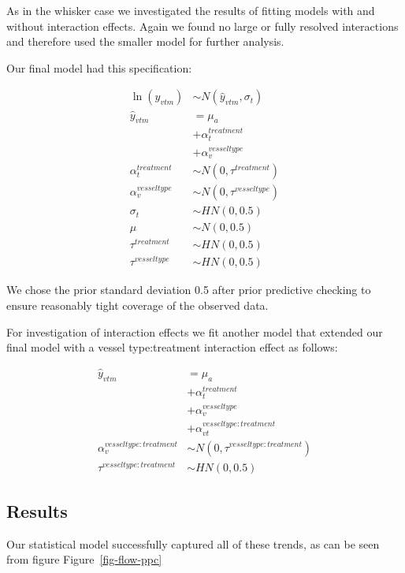\documentclass[
  letterpaper,
  DIV=11,
  numbers=noendperiod,
  oneside]{scrartcl}
\theoremstyle{plain}
\theoremstyle{remark}
\begin{document}
As in the whisker case we investigated the results of fitting models
with and without interaction effects. Again we found no large or fully
resolved interactions and therefore used the smaller model for further
analysis.

Our final model had this specification:

\begin{align}
\ln(y_{vtm}) &\sim N(\hat{y}_{vtm}, \sigma_t) \label{eq-flow-model} \\
\hat{y}_{vtm} &= \mu_a \nonumber \\
  &+ \alpha^{treatment}_{t} \nonumber \\
  &+ \alpha^{vesseltype}_{v} \nonumber \\
\alpha^{treatment}_t &\sim N(0, \tau^{treatment}) \nonumber \\
\alpha^{vesseltype}_v &\sim N(0, \tau^{vesseltype}) \nonumber \\
\sigma_t &\sim HN(0, 0.5) \nonumber \\
\mu &\sim N(0, 0.5) \nonumber \\
\tau^{treatment} &\sim HN(0, 0.5) \nonumber \\
\tau^{vesseltype} &\sim HN(0, 0.5) \nonumber
\end{align}

We chose the prior standard deviation 0.5 after prior predictive
checking to ensure reasonably tight coverage of the observed data.

For investigation of interaction effects we fit another model that
extended our final model with a vessel type:treatment interaction effect
as follows:

\begin{align}
\hat{y}_{vtm} &= \mu_a \nonumber \\
  &+ \alpha^{treatment}_{t} \nonumber \\
  &+ \alpha^{vesseltype}_{v} \nonumber \\
  &+ \alpha^{vesseltype:treatment}_{vt} \nonumber \\
\alpha^{vesseltype:treatment}_v &\sim N(0, \tau^{vesseltype:treatment}) \nonumber \\
\tau^{vesseltype:treatment} &\sim HN(0, 0.5) \nonumber
\end{align}

\subsection{Results}\label{results-2}

Our statistical model successfully captured all of these trends, as can
be seen from figure Figure~\ref{fig-flow-ppc}
\end{document}
